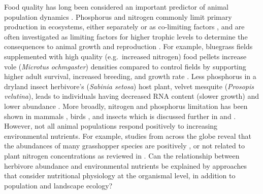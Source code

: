 \documentclass[
]{article}
\begin{document}
Food quality has long been considered an important predictor of animal
population dynamics
\citep{andersen_stoichiometry_2004, white_inadequate_1993}. Phosphorus
and nitrogen commonly limit primary production in ecosystems, either
separately or as co-limiting factors
\citep{tyrrell_relative_1999, vitousek_terrestrial_2010}, and are often
investigated as limiting factors for higher trophic levels to determine
the consequences to animal growth and reproduction
\citep{andersen_stoichiometry_2004}. For example, bluegrass fields
supplemented with high quality (e.g.~increased nitrogen) food pellets
increase vole (\emph{Microtus ochmgaster}) densities compared to control
fields by supporting higher adult survival, increased breeding, and
growth rate \citep{cole_influence_1978}. Less phosphorus in a dryland
insect herbivore's (\emph{Sabinia setosa}) host plant, velvet mesquite
(\emph{Prosopis velutina}), leads to individuals having decreased RNA
content (slower growth) and lower abundance
\citep{schade_stoichiometric_2003}. More broadly, nitrogen and
phosphorus limitation has been shown in mammals
\citep{randolph_nutritional_1995, white_inadequate_1993}, birds
\citep{forero_conspecific_2002, granbom_food_2006}, and insects
\citep{floyd_frontiers_1996, huberty_consequences_2006, marsh_decline_1995, perkins_dietary_2004}
which is discussed further in \citet{white_role_2008} and
\citet{andersen_stoichiometry_2004}. However, not all animal populations
respond positively to increasing environmental nutrients. For example,
studies from across the globe reveal that the abundances of many
grasshopper species are positively
\citep{joern_not_2012, ozment_tracking_2021, welti_bottomup_2020, welti_nutrient_2020, zhu_effects_2020, zhu_negative_2019},
or not related
\citep{heidorn_feeding_1987, jonas_hostplant_2008, lenhart_water_2015, ozment_tracking_2021}
to plant nitrogen concentrations as reviewed in \citet{cease_how_2024}.
Can the relationship between herbivore abundance and environmental
nutrients be explained by approaches that consider nutritional
physiology at the organismal level, in addition to population and
landscape ecology?
\end{document}
